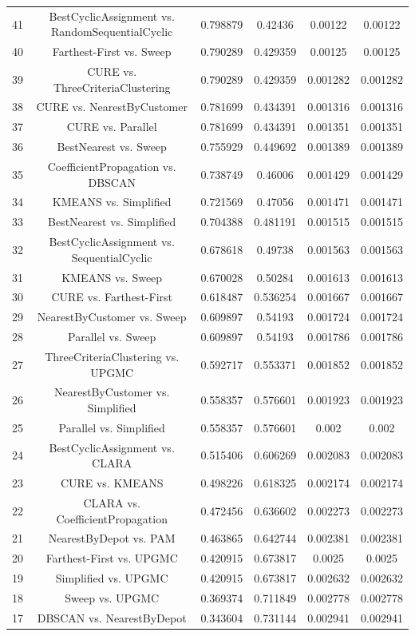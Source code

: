 \documentclass[a4paper,10pt]{article}
\begin{document}
\begin{landscape}
\begin{table}[!htp]
\begin{tabular}{cccccc}
41&BestCyclicAssignment vs. RandomSequentialCyclic&0.798879&0.42436&0.00122&0.00122\\
40&Farthest-First vs. Sweep&0.790289&0.429359&0.00125&0.00125\\
39&CURE vs. ThreeCriteriaClustering&0.790289&0.429359&0.001282&0.001282\\
38&CURE vs. NearestByCustomer&0.781699&0.434391&0.001316&0.001316\\
37&CURE vs. Parallel&0.781699&0.434391&0.001351&0.001351\\
36&BestNearest vs. Sweep&0.755929&0.449692&0.001389&0.001389\\
35&CoefficientPropagation vs. DBSCAN&0.738749&0.46006&0.001429&0.001429\\
34&KMEANS vs. Simplified&0.721569&0.47056&0.001471&0.001471\\
33&BestNearest vs. Simplified&0.704388&0.481191&0.001515&0.001515\\
32&BestCyclicAssignment vs. SequentialCyclic&0.678618&0.49738&0.001563&0.001563\\
31&KMEANS vs. Sweep&0.670028&0.50284&0.001613&0.001613\\
30&CURE vs. Farthest-First&0.618487&0.536254&0.001667&0.001667\\
29&NearestByCustomer vs. Sweep&0.609897&0.54193&0.001724&0.001724\\
28&Parallel vs. Sweep&0.609897&0.54193&0.001786&0.001786\\
27&ThreeCriteriaClustering vs. UPGMC&0.592717&0.553371&0.001852&0.001852\\
26&NearestByCustomer vs. Simplified&0.558357&0.576601&0.001923&0.001923\\
25&Parallel vs. Simplified&0.558357&0.576601&0.002&0.002\\
24&BestCyclicAssignment vs. CLARA&0.515406&0.606269&0.002083&0.002083\\
23&CURE vs. KMEANS&0.498226&0.618325&0.002174&0.002174\\
22&CLARA vs. CoefficientPropagation&0.472456&0.636602&0.002273&0.002273\\
21&NearestByDepot vs. PAM&0.463865&0.642744&0.002381&0.002381\\
20&Farthest-First vs. UPGMC&0.420915&0.673817&0.0025&0.0025\\
19&Simplified vs. UPGMC&0.420915&0.673817&0.002632&0.002632\\
18&Sweep vs. UPGMC&0.369374&0.711849&0.002778&0.002778\\
17&DBSCAN vs. NearestByDepot&0.343604&0.731144&0.002941&0.002941\\

\end{tabular}
\end{table}
\end{landscape}
\end{document}
